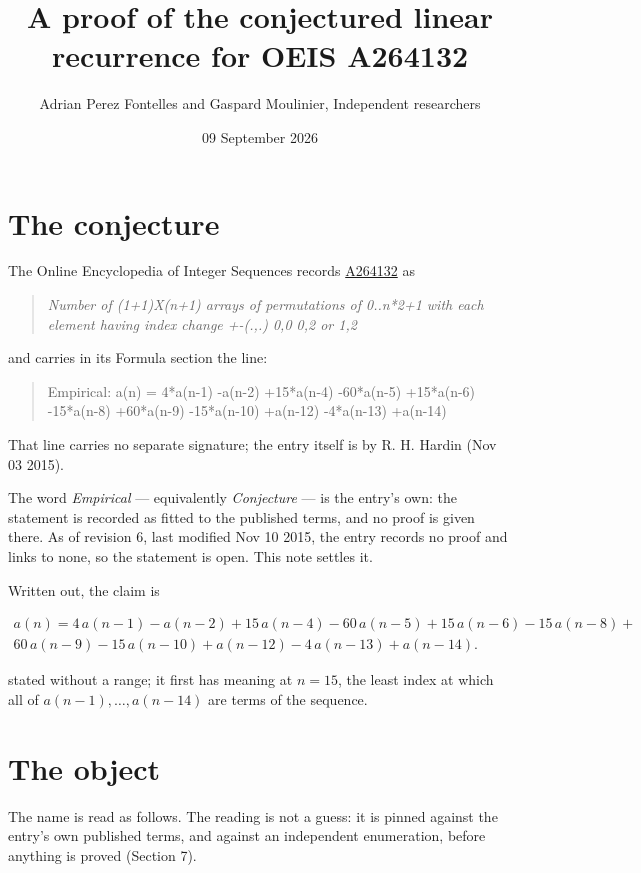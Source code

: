 \documentclass[11pt]{article}
\title{A proof of the conjectured linear recurrence for OEIS A264132}
\author{Adrian Perez Fontelles and Gaspard Moulinier, Independent researchers}
\date{09 September 2026}
\theoremstyle{definition}
\begin{document}
\maketitle
\section{The conjecture}

The Online Encyclopedia of Integer Sequences records \href{https://oeis.org/A264132}{A264132} as

\begin{quote}\itshape Number of (1+1)X(n+1) arrays of permutations of 0..n*2+1 with each element having index change +-(.,.) 0,0 0,2 or 1,2\end{quote}

and carries in its Formula section the line:

\begin{quote}\ttfamily Empirical: a(n) = 4*a(n-1) -a(n-2) +15*a(n-4) -60*a(n-5) +15*a(n-6) -15*a(n-8) +60*a(n-9) -15*a(n-10) +a(n-12) -4*a(n-13) +a(n-14)\end{quote}

That line carries no separate signature; the entry itself is by R. H. Hardin (Nov 03 2015).

The word {\itshape Empirical} --- equivalently {\itshape Conjecture} --- is the entry's own: the statement is recorded as fitted to the published terms, and no proof is given there. As of revision 6, last modified Nov 10 2015, the entry records no proof and links to none, so the statement is open. This note settles it.

Written out, the claim is

\begin{multline*} a(n) = 4\,a(n-1) - a(n-2) + 15\,a(n-4) - 60\,a(n-5) + 15\,a(n-6) - 15\,a(n-8) + \\ 60\,a(n-9) - 15\,a(n-10) + a(n-12) - 4\,a(n-13) + a(n-14). \end{multline*}

stated without a range; it first has meaning at $n = 15$, the least index at which all of $a(n-1),\dots,a(n-14)$ are terms of the sequence.

\section{The object}

The name is read as follows. The reading is not a guess: it is pinned against the entry's own published terms, and against an independent enumeration, before anything is proved (Section 7).
\end{document}
